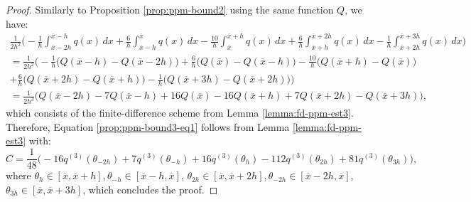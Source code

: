 \begin{proof}
	Similarly to Proposition \ref{prop:ppm-bound2} using the same function $Q$, we have:
	\begin{align*}
	\frac{1}{2h^2}
		\bigg(-\frac{1}{h} \int_{\overline{x}-2h}^{\overline{x}-h} q(x) \,dx 
		      +\frac{6}{h}\int_{\overline{x}-h}^{\overline{x}} q(x) \,dx   
		      -\frac{10}{h}\int_{\overline{x}}^{\overline{x}+h} q(x) \,dx  
		      +\frac{6}{h} \int_{\overline{x}+h}^{\overline{x}+2h} q(x) \,dx   
		      -\frac{1}{h} \int_{\overline{x}+2h}^{\overline{x}+3h} q(x) \,dx   
		\bigg)\\ 
		= \frac{1}{2h^2} \bigg(
		-\frac{1}{h}   \big( Q(\overline{x}-h)- Q(\overline{x}-2h)\big) 
		+\frac{6}{h} \big( Q(\overline{x}) - Q(\overline{x}-h) \big) 
		-\frac{10}{h} \big( Q(\overline{x}+h) - Q(\overline{x})  \big) \\
		+\frac{6}{h}  \big( Q(\overline{x}+2h) - Q(\overline{x}+h)  \big) 
		-\frac{1}{h}  \big( Q(\overline{x}+3h) - Q(\overline{x}+2h)  \big) 
		\bigg)\\
		= \frac{1}{2h^3}\bigg(Q(\overline{x}-2h) - 7Q(\overline{x}-h) + 16Q(\overline{x}) 
		-16Q(\overline{x}+h) +7Q(\overline{x}+2h) - Q(\overline{x}+3h)  \bigg),
	\end{align*}
	which consists of the finite-difference scheme from Lemma \ref{lemma:fd-ppm-est3}. 
	Therefore, Equation \eqref{prop:ppm-bound3-eq1} follows from 
	Lemma \ref{lemma:fd-ppm-est3} with:
	\begin{equation}
		\label{prop:ppm-bound3-eq2}
		C = \frac{1}{48}\bigg(-16q^{(3)}(\theta_{-2h}) + 7q^{(3)}(\theta_{-h}) +16q^{(3)}(\theta_{h}) - 112q^{(3)}(\theta_{2h}) + 81q^{(3)}(\theta_{3h})\bigg), 
	\end{equation}
	where $\theta_{h} \in [\overline{x},\overline{x}+h], \theta_{-h}\in [\overline{x}-h,\overline{x}]$, 
	$\theta_{2h} \in [\overline{x},\overline{x}+2h], \theta_{-2h}\in [\overline{x}-2h,\overline{x}]$,
	$\theta_{3h} \in [\overline{x},\overline{x}+3h]$,
	which concludes the proof.

\renewcommand\qedsymbol{} %
\end{proof}

